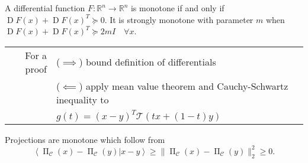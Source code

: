 \documentclass[varwidth=15cm, border=.5cm]{standalone}
\DeclareMathOperator{\jacobian}{D}
\DeclareMathOperator{\proj}{\Pi}
\newcommand*\from{\colon}
\newcommand{\innerp}[2]{\left\langle #1 \vert #2 \right\rangle}
\begin{document}
\begin{definition}[label=1_xd5vw5, name=Monotone Operators and Coercivity]
	\begin{example}[label=ui6ez2bq, name=Differentiable Function]
		A differential function \(F\from\mathbb R^n\to\mathbb R^n\) is monotone
		if and only if \(\jacobian F(x) + \jacobian F(x)^T \succeq 0\). It is
		strongly monotone with parameter \(m\) when \(\jacobian F(x) + \jacobian
		F(x)^T\succeq 2mI\quad\forall x\).
		\begin{tabular}{rl}
			For a proof & (\( \implies \)) bound definition of differentials \\
				    & (\( \impliedby \)) apply mean value
				    theorem and Cauchy-Schwartz inequality to \\
				    &\quad\(g(t) = (x - y)^T\mathcal T(tx +
				    (1-t) y) \)
		\end{tabular}
	\end{example}
	\begin{example}[label=vuj2l97d, name=Projections]
		Projections are monotone which follow from
		\[
			\innerp{\proj_{\mathcal C}(x) - \proj_{\mathcal C}(y)}{x-y} \geq \lVert\proj_{\mathcal C}(x) - \proj_{\mathcal C}(y)\lVert^2_2 \geq 0.
		\]
	\end{example}
\end{definition}
\end{document}
